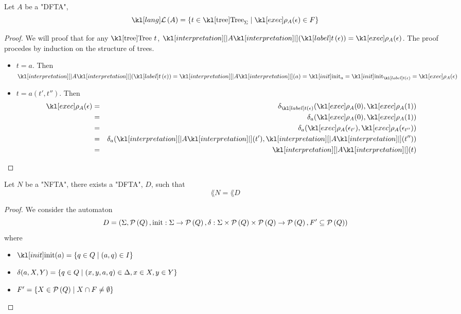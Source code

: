 \documentclass{article}
\begin{document}
\begin{remark}
	Let $A$ be a "DFTA",
	$$ \lang A = \setdef {t \in \tree_{\Sigma}} {\exec A (\epsilon) \in F} $$
\end{remark}

\begin{proof}
	We will proof that for any $\tree \ t$, $\interpret A (\tlabel t {\epsilon}) = \exec A (\epsilon)$.
	The proof procedes by induction on the structure of trees.
	\begin{itemize}
		\item $t = a$. Then
		      $\interpret A (\tlabel t {\epsilon}) = \interpret A (a)=  \init_a = \init_{\tlabel t {\epsilon}} = \exec A (\epsilon)$
		\item $t = a(t',t'')$. Then
		      \begin{eqnarray*}
			      \exec A (\epsilon)  &=& \delta_{\tlabel t {\epsilon}}(\exec A (0), \exec A (1)) \\
			      &=& \delta_a (\exec A (0), \exec A (1)) \\
			      &=& \delta_a (\exec A (\epsilon_{t'}), \exec A (\epsilon_{t''})) \\
			      &=& \delta_a (\interpret A (t'), \interpret A (t'')) \\
			      &=& \interpret A (t)
		      \end{eqnarray*}
	\end{itemize}
\end{proof}

\begin{theorem}
	Let $N$ be a "NFTA", there exists a "DFTA", $D$, such that
	$$\lang N = \lang D$$
\end{theorem}

\begin{proof}
	We consider the automaton
	$$ D = (\Sigma, \mathcal{P}\left(Q\right), \text{init} : \Sigma \to \mathcal{P}\left(Q\right), \delta : \Sigma \times \mathcal{P}\left(Q\right) \times \mathcal{P}\left(Q\right) \to \mathcal{P}\left(Q\right), F' \subseteq \mathcal{P}\left(Q\right)) $$
	where
	\begin{itemize}
		\item $\init (a) = \setdef {q \in Q} {(a,q) \in I}$
		\item $\delta (a, X, Y) = \left\{q \in  Q \mid (x,y,a,q) \in \Delta, x \in X, y \in Y\right\}$
		\item $F' = \left\{X \in \mathcal{P}\left(Q\right) \mid X \cap F \neq \emptyset\right\}$
	\end{itemize}
\end{proof}
\end{document}
